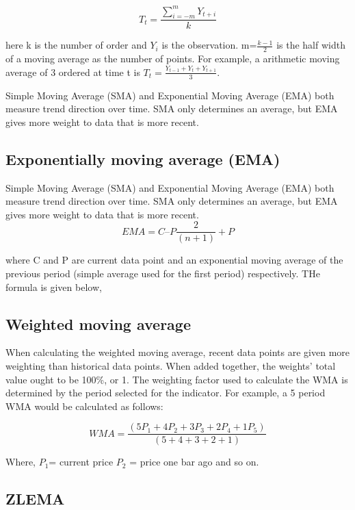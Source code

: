 \documentclass{article}
\begin{document}
\[
{T_t = \frac{\sum_{i=-m}^{m} Y_{t+i}}{k}} 
\]

here k is the number of order and \(Y_i\) is the observation.
m=\(\frac{k-1}{2}\) is the half width of a moving average as the number
of points. For example, a arithmetic moving average of 3 ordered at time
t is \(T_t=\frac{Y_{t-1}+Y_t+Y_{t+1}}{3}\).

Simple Moving Average (SMA) and Exponential Moving Average (EMA) both
measure trend direction over time. SMA only determines an average, but
EMA gives more weight to data that is more recent.

\hypertarget{exponentially-moving-average-ema}{%
\subsection{Exponentially moving average
(EMA)}\label{exponentially-moving-average-ema}}

Simple Moving Average (SMA) and Exponential Moving Average (EMA) both
measure trend direction over time. SMA only determines an average, but
EMA gives more weight to data that is more recent. \[
EMA = C – P  \frac{2}{(n+1)} + P
\]

where C and P are current data point and an exponential moving average
of the previous period (simple average used for the first period)
respectively. THe formula is given below,

\hypertarget{weighted-moving-average}{%
\subsection{Weighted moving average}\label{weighted-moving-average}}

When calculating the weighted moving average, recent data points are
given more weighting than historical data points. When added together,
the weights' total value ought to be 100\%, or 1. The weighting factor
used to calculate the WMA is determined by the period selected for the
indicator. For example, a 5 period WMA would be calculated as follows:

\[
WMA = \frac{(5P_{1}  + 4P_2  + 3P_3  + 2P_4  + 1P_5 )} {(5 + 4+ 3 + 2 + 1)}
\]

Where, \(P_1\)= current price \(P_2\) = price one bar ago and so on.

\hypertarget{zlema}{%
\subsection{ZLEMA}\label{zlema}}
\end{document}
